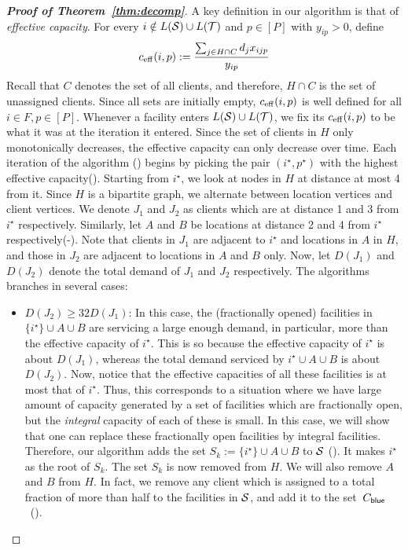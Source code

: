 \begin{proof}[{\bf Proof of Theorem~\ref{thm:decomp}}]
\noindent
A key definition in our algorithm is that of {\em effective capacity}. For every $i\notin L({\cal S})\cup L({\cal T})$ and $p\in [P]$ with $y_{ip} > 0$, define
\[
c_{\mathrm{eff}}(i,p) := \frac{\sum_{j\in H \cap C} d_j x_{ijp}}{y_{ip}}
\]
Recall that $C$ denotes the set of all clients, and therefore, $H \cap C$ is the set of unassigned clients.
Since all sets
 are initially empty, $c_{\mathrm{eff}}(i,p)$ is well defined for all $i\in F, p\in [P]$. Whenever a facility enters $L({\cal S})\cup L({\cal T})$, we fix its $c_{\mathrm{eff}}(i,p)$ to be what it was at the iteration it entered.
Since the set of clients in $H$ only monotonically decreases, the effective capacity can only decrease over time. Each iteration of the algorithm () begins by picking the pair $(i^\star, p^\star)$ with the highest
effective capacity(). Starting from $i^\star$, we look at nodes in $H$ at distance at most 4 from it. Since
$H$ is a bipartite graph, we alternate between location vertices and client vertices. We denote $J_1$ and $J_2$ as clients which are at distance 1 and 3 from $i^\star$ respectively. Similarly, let $A$ and $B$ be locations at distance 2 and 4 from $i^\star$ respectively(-). Note that clients in $J_1$ are adjacent to $i^\star$ and locations in $A$ in $H$, and those in $J_2$ are adjacent to locations in $A$ and $B$ only. Now, let $D(J_1)$ and $D(J_2)$ denote the
total demand of $J_1$ and $J_2$ respectively. The algorithms branches in several cases:
\begin{itemize}
\item $D(J_2) \geq 32 D(J_1)$: In this case, the (fractionally opened) facilities in $\{i^\star\} \cup A \cup B$ are servicing a large enough demand, in particular, more than the effective capacity of $i^\star$. This is so because
    the effective capacity of $i^\star$ is about $D(J_1)$, whereas the total demand serviced by $i^\star \cup A \cup B$ is about $D(J_2)$. Now, notice that the effective capacities of all these facilities is at most that of $i^\star$. Thus,
    this corresponds to a situation where we have large amount of capacity generated by a set of facilities which are fractionally open, but the {\em integral} capacity of each of these is small. In this case, we will show that one can replace these fractionally open facilities by integral facilities. Therefore, our algorithm adds the set
    $ S_k := \{i^\star\} \cup A \cup B$ to ${\cal S}$ (). It makes $i^\star$ as the root of  $S_k$. The set
    $S_k$ is now removed from $H$. We will also remove $A$ and $B$ from $H$. In fact, we remove any client which is assigned to a total fraction of more than half to the facilities in ${\cal S}$, and add it to the set~$C_{\mathsf{blue}}$~().

\end{itemize}
\end{proof}
